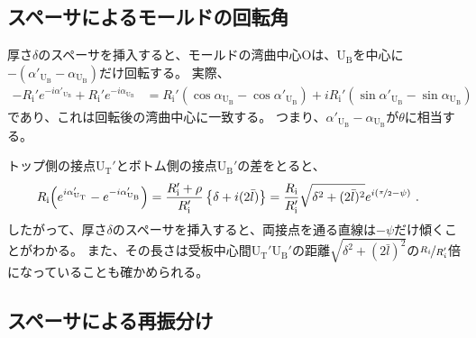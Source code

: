\subsection{スペーサによるモールドの回転角}
厚さ$\delta$のスペーサを挿入すると、モールドの湾曲中心Oは、U$_\mathrm B$を中心に$-\left(\alpha'_{\mathrm U_\mathrm B}\!-\alpha_{\mathrm U_\mathrm B}\right)$だけ回転する。
実際、
\begin{align*}
  -R_\mathrm i'e^{-i\alpha'_{\mathrm U_\mathrm B}}+R_\mathrm i'e^{-i\alpha_{\mathrm U_\mathrm B}}
  &= R_\mathrm i'(\cos\alpha_{\mathrm U_\mathrm B}-\cos\alpha'_{\mathrm U_\mathrm B})
     +iR_\mathrm i'(\sin\alpha'_{\mathrm U_\mathrm B}-\sin\alpha_{\mathrm U_\mathrm B})
\end{align*}
であり、これは回転後の湾曲中心に一致する。
つまり、$\alpha'_{\mathrm U_\mathrm B}\!-\alpha_{\mathrm U_\mathrm B}$が$\theta$に相当する。
\begin{hosoku}
トップ側の接点U$_\mathrm T'$とボトム側の接点U$_\mathrm B'$の差をとると、
\begin{align*}
  R_\mathrm i\!\left(e^{i\alpha_{\mathrm U_\mathrm T}'}-e^{-i\alpha'_{\mathrm U_\mathrm B}}\right)
  &= \frac{R_\mathrm i'+\rho}{R_\mathrm i'}\left\{\delta+i(2\bar l)\right\}
   = \frac{R_\mathrm i}{R_\mathrm i'}\sqrt{\delta^2+(2\bar l)^2}e^{i(\nicefrac\pi2-\psi)}\ .
\end{align*}
したがって、厚さ$\delta$のスペーサを挿入すると、両接点を通る直線は$-\psi$だけ傾くことがわかる。
また、その長さは受板中心間U$_\mathrm T'$U$_\mathrm B'$の距離$\sqrt{\delta^2+(2\bar l)^2}$の$\nicefrac{R_i}{R_i'}$倍になっていることも確かめられる。
\end{hosoku}


\subsection{スペーサによる再振分け}


